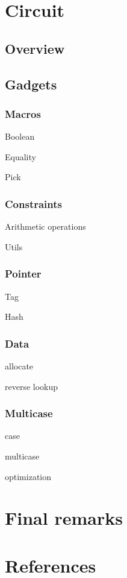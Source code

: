 \documentclass[10pt, english]{article}
\begin{document}
\section{Circuit}

\subsection{Overview}

\subsection{Gadgets}

\subsubsection{Macros}

Boolean

Equality

Pick

\subsubsection{Constraints}

Arithmetic operations

Utils

\subsubsection{Pointer}

Tag

Hash

\subsubsection{Data}

allocate

reverse lookup

\subsubsection{Multicase}

case

multicase

optimization


\section{Final remarks}

\section{References}




\end{document}
